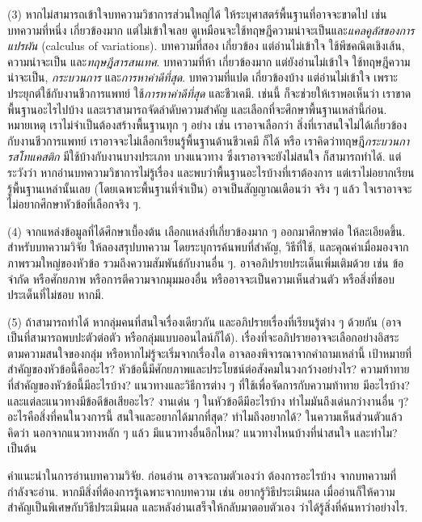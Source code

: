 \begin{Exercise}
(3) หากไม่สามารถเข้าใจบทความวิชาการส่วนใหญ่ได้
ให้ระบุศาสตร์พื้นฐานที่อาจจะขาดไป
เช่น
บทความที่หนึ่ง เกี่ยวข้องมาก แต่ไม่เข้าใจเลย ดูเหมือนจะใช้ทฤษฎีความน่าจะเป็นและ\textit{แคลคูลัสของการแปรผัน} (calculus of variations).
บทความที่สอง เกี่ยวข้อง แต่อ่านไม่เข้าใจ ใช้พีชคณิตเชิงเส้น, ความน่าจะเป็น และ\textit{ทฤษฎีสารสนเทศ}.
บทความที่ห้า เกี่ยวข้องมาก แต่ยังอ่านไม่เข้าใจ ใช้ทฤษฎีความน่าจะเป็น,
\textit{กระบวนการ} และ\textit{การหาค่าดีที่สุด}.
บทความที่แปด เกี่ยวข้องบ้าง แต่อ่านไม่เข้าใจ เพราะประยุกต์ใช้กับงานชีวการแพทย์
ใช้\textit{การหาค่าดีที่สุด}
และชีวเคมี.
เช่นนี้ ก็จะช่วยให้เราพอเห็นว่า
เราขาดพื้นฐานอะไรไปบ้าง
และเราสามารถจัดลำดับความสำคัญ
และเลือกที่จะศึกษาพื้นฐานเหล่านี้ก่อน.
หมายเหตุ เราไม่จำเป็นต้องสร้างพื้นฐานทุก ๆ อย่าง
เช่น เราอาจเลือกว่า สิ่งที่เราสนใจไม่ได้เกี่ยวข้องกับงานชีวการแพทย์
เราอาจจะไม่เลือกเรียนรู้พื้นฐานด้านชีวเคมี ก็ได้
หรือ 
เราคิดว่าทฤษฎี\textit{กระบวนการสโทแคสติก} มีใช้บ้างกับงานบางประเภท บางแนวทาง ซึ่งเราอาจจะยังไม่สนใจ
ก็สามารถทำได้.
แต่ระวังว่า
หากอ่านบทความวิชาการไม่รู้เรื่อง
และพบว่าพื้นฐานอะไรบ้างที่เราต้องการ
แต่เราไม่อยากเรียนรู้พื้นฐานเหล่านั้นเลย
(โดยเฉพาะพื้นฐานที่จำเป็น)
อาจเป็นสัญญาณเตือนว่า 
จริง ๆ แล้ว ใจเราอาจจะไม่อยากศึกษาหัวข้อที่เลือกจริง ๆ.

(4) จากแหล่งข้อมูลที่ได้ศึกษาเบื้องต้น
เลือกแหล่งที่เกี่ยวข้องมาก ๆ ออกมาศึกษาต่อ ให้ละเอียดขึ้น.
สำหรับบทความวิจัย
ให้ลองสรุปบทความ 
โดยระบุการค้นพบที่สำคัญ, วิธีที่ใช้,
และคุณค่าเมื่อมองจากภาพรวมใหญ่ของหัวข้อ รวมถึงความสัมพันธ์กับงานอื่น ๆ.
อาจอภิปรายประเด็นเพิ่มเติมด้วย 
เช่น ข้อจำกัด  หรือศักยภาพ
หรือการตีความจากมุมมองอื่น
หรืออาจจะเป็นความเห็นส่วนตัว
หรือสิ่งที่ชอบ ประเด็นที่ไม่ชอบ หากมี.


(5) ถ้าสามารถทำได้ หากลุ่มคนที่สนใจเรื่องเดียวกัน
และอภิปรายเรื่องที่เรียนรู้ต่าง ๆ ด้วยกัน (อาจเป็นที่สามารถพบปะตัวต่อตัว หรือกลุ่มแบบออนไลน์ก็ได้).
เรื่องที่จะอภิปรายอาจจะเลือกอย่างอิสระตามความสนใจของกลุ่ม หรือหากไม่รู้จะเริ่มจากเรื่องใด
อาจลองพิจารณาจากคำถามเหล่านี้
เป้าหมายที่สำคัญของหัวข้อนี้คืออะไร?
หัวข้อนี้มีศักยภาพและประโยชน์ต่อสังคมในวงกว้างอย่างไร?
ความท้าทายที่สำคัญของหัวข้อนี้มีอะไรบ้าง?
แนวทางและวิธีการต่าง ๆ ที่ใช้เพื่อจัดการกับความท้าทาย มีอะไรบ้าง?
และแต่ละแนวทางมีข้อดีข้อเสียอะไร?
งานเด่น ๆ ในหัวข้อดีมีอะไรบ้าง ทำไมมันถึงเด่นกว่างานอื่น ๆ?
อะไรคือสิ่งที่คนในวงการนี้ สนใจและอยากได้มากที่สุด?
ทำไมถึงอยากได้?
ในความเห็นส่วนตัวแล้ว คิดว่า
นอกจากแนวทางหลัก ๆ แล้ว
มีแนวทางอื่นอีกไหม?
แนวทางไหนบ้างที่น่าสนใจ และทำไม?
เป็นต้น

คำแนะนำในการอ่านบทความวิจัย.
ก่อนอ่าน อาจจะถามตัวเองว่า
ต้องการอะไรบ้าง จากบทความที่กำลังจะอ่าน.
หากมีสิ่งที่ต้องการรู้เฉพาะจากบทความ
เช่น อยากรู้วิธีประเมินผล
เมื่ออ่านก็ให้ความสำคัญเป็นพิเศษกับวิธีประเมินผล และหลังอ่านเสร็จให้กลับมาตอบตัวเอง
ว่าได้รู้สิ่งที่ค้นหาว่าอย่างไร.


\end{Exercise}
